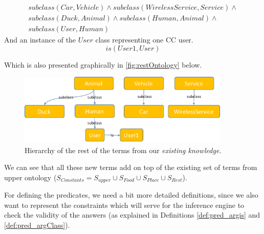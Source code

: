 \begin{equation}\label{as:kbPlaceSubclasses}
\begin{gathered}
    subclass(Car,Vehicle) \land subclass(WirelessService,Service)\land\\
	subclass(Duck,Animal)\land subclass(Human,Animal)\land \\
	subclass(User,Human)
\end{gathered}
\end{equation}
And an instance of the $User$ class representing one CC user.
\begin{equation}\label{as:user1}
	is(User1,User)
\end{equation}

Which is also presented graphically in \autoref{fig:restOntology} below.
\begin{figure}[H]
	\centering
		\includegraphics[width=0.9\textwidth]{figures/restOntology.png}
	\caption{Hierarchy of the rest of the terms from our \emph{existing 
	knowledge.}}
	\label{fig:restOntology}
\end{figure}
We can see that all these new terms add on top of the existing set of terms from 
upper ontology ($S_{Constants} = S_{upper} \cup S_{Food} \cup S_{Place} 
\cup S_{Rest}$). 

For defining the predicates, we need a bit more detailed definitions, since we 
also want to represent the constraints which will serve for the inference 
engine to check the validity of the answers (as explained in Definitions
\ref{def:pred_argis} and \ref{def:pred_argClass}).

